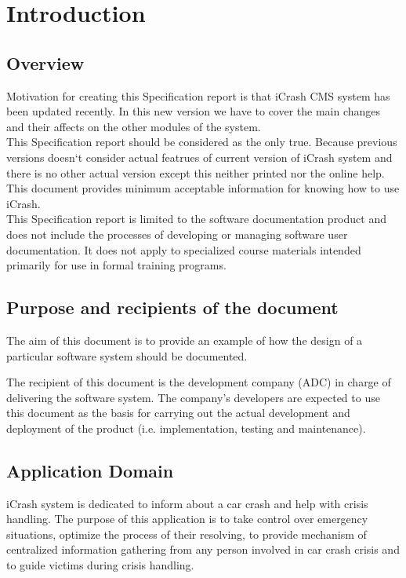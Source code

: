
\chapter{Introduction}
\label{chap:introduction}

\section{Overview}
Motivation for creating this Specification report is that iCrash CMS system has
been updated recently. In this new version we have to cover the main changes and
their affects on the other modules of the system. \\
This Specification report should be considered as the only true. Because
previous versions doesn`t consider actual featrues of current version of iCrash system
and there is no other actual version except this neither printed nor the online
help. This document provides minimum acceptable information for knowing how to
use iCrash. \\
This Specification report is limited to the software documentation product and
does not include the processes of developing or managing software user documentation. It does not apply to specialized course materials
intended primarily for use in formal training programs. \\

\section{Purpose and recipients of the document}
The aim of this document is to provide an example of how the design of a
particular software system should be documented.

The recipient of this document is the development company (ADC) in charge
of delivering the software system. The company's developers are
expected to use this document as the basis for carrying out the actual
development and deployment of the product (i.e. implementation, testing
and maintenance).

 
\section{Application Domain}
iCrash system is dedicated to inform about a car crash and help with crisis
handling. The purpose of this application is to take control over emergency
situations, optimize the process of their resolving, to provide mechanism of
centralized information gathering from any person involved in car crash crisis
and to guide victims during crisis handling.
 
